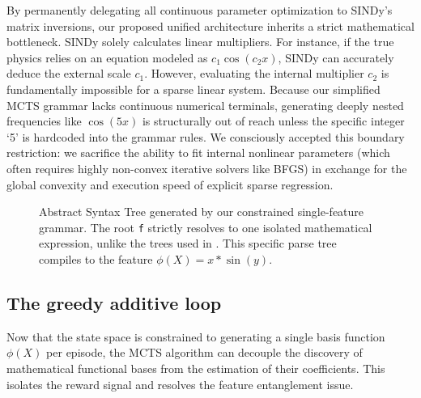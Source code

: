 \documentclass[11pt, a4paper]{article}
\begin{document}
By permanently delegating all continuous parameter optimization to SINDy's matrix inversions, our proposed unified architecture inherits a strict mathematical bottleneck. SINDy solely calculates linear multipliers. For instance, if the true physics relies on an equation modeled as $c_1 \cos(c_2 x)$, SINDy can accurately deduce the external scale $c_1$. However, evaluating the internal multiplier $c_2$ is fundamentally impossible for a sparse linear system. Because our simplified MCTS grammar lacks continuous numerical terminals, generating deeply nested frequencies like $\cos(5x)$ is structurally out of reach unless the specific integer `5' is hardcoded into the grammar rules. We consciously accepted this boundary restriction: we sacrifice the ability to fit internal nonlinear parameters (which often requires highly non-convex iterative solvers like BFGS) in exchange for the global convexity and execution speed of explicit sparse regression.


\begin{figure}[H]
    \centering
    \caption{Abstract Syntax Tree generated by our constrained single-feature grammar. The root \texttt{f} strictly resolves to one isolated mathematical expression, unlike the trees used in \cite{sun2023spl}. This specific parse tree compiles to the feature $\phi(X) = x * \sin(y)$.}
    \label{fig:single_feature_ast}
\end{figure}

\subsection{The greedy additive loop}


Now that the state space is constrained to generating a single basis function $\phi(X)$ per episode, the MCTS algorithm can decouple the discovery of mathematical functional bases from the estimation of their coefficients. This isolates the reward signal and resolves the feature entanglement issue.
\end{document}

